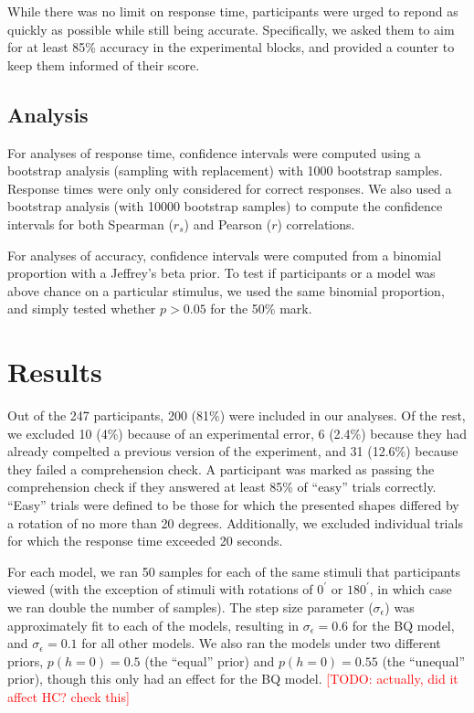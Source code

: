 \documentclass[10pt,letterpaper]{article}
\newcommand{\TODO}[1]{\textcolor{red}{[TODO: #1]}}
\newcommand{\Bq}[0]{BQ}
\begin{document}
While there was no limit on response time, participants were urged to
repond as quickly as possible while still being
accurate. Specifically, we asked them to aim for at least 85\%
accuracy in the experimental blocks, and provided a counter to keep
them informed of their score.

\subsection{Analysis}

For analyses of response time, confidence intervals were computed
using a bootstrap analysis (sampling with replacement) with 1000
bootstrap samples. Response times were only only considered for
correct responses.  We also used a bootstrap analysis (with 10000
bootstrap samples) to compute the confidence intervals for both
Spearman ($r_s$) and Pearson ($r$) correlations.

For analyses of accuracy, confidence intervals were computed from a
binomial proportion with a Jeffrey's beta prior.  To test if
participants or a model was above chance on a particular stimulus, we
used the same binomial proportion, and simply tested whether $p>0.05$
for the 50\% mark.

\section{Results}

Out of the 247 participants, 200 (81\%) were included in our
analyses. Of the rest, we excluded 10 (4\%) because of an experimental
error, 6 (2.4\%) because they had already compelted a previous version
of the experiment, and 31 (12.6\%) because they failed a comprehension
check. A participant was marked as passing the comprehension check if
they answered at least 85\% of ``easy'' trials correctly. ``Easy''
trials were defined to be those for which the presented shapes
differed by a rotation of no more than 20 degrees. Additionally, we
excluded individual trials for which the response time exceeded 20
seconds.

For each model, we ran 50 samples for each of the same stimuli that
participants viewed (with the exception of stimuli with rotations of
$0^\prime$ or $180^\prime$, in which case we ran double the number of
samples). The step size parameter ($\sigma_\epsilon$) was
approximately fit to each of the models, resulting in
$\sigma_\epsilon=0.6$ for the \Bq{} model, and $\sigma_\epsilon=0.1$
for all other models. We also ran the models under two different
priors, $p(h=0)=0.5$ (the ``equal'' prior) and $p(h=0)=0.55$ (the
``unequal'' prior), though this only had an effect for the \Bq{}
model. \TODO{actually, did it affect HC?  check this}
\end{document}
